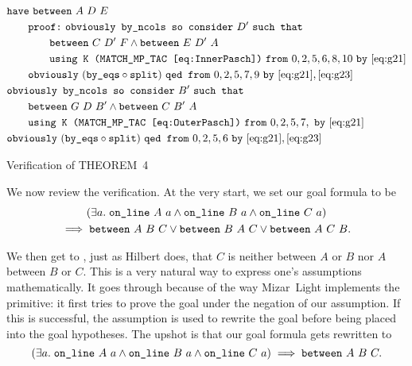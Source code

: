 \begin{boxedfigure}
\begin{align*}
&\texttt{have}\ \texttt{between}\ A\ D\ E\\
&\qquad \texttt{proof:}\ \texttt{obviously by\_ncols so consider}\ D'\ \texttt{such that}\\
&\qquad\qquad\texttt{between}\ C\ D'\ F\wedge\texttt{between}\ E\ D'\ A\\
&\qquad\qquad\texttt{using K (MATCH\_MP\_TAC \eqref{eq:InnerPasch})}\ \texttt{from}\ 0,2,5,6,8,10\ \texttt{by}\ \eqref{eq:g21}\\
&\qquad\texttt{obviously}\ (\texttt{by\_eqs}\circ\texttt{split})\ \texttt{qed from}\ 0,2,5,7,9\ \texttt{by}\ \eqref{eq:g21},\eqref{eq:g23}\\
&\texttt{obviously by\_ncols so consider}\ B'\ \texttt{such that}\\
&\qquad\texttt{between}\ G\ D\ B'\wedge\texttt{between}\ C\ B'\ A\\
&\qquad\texttt{using K (MATCH\_MP\_TAC \eqref{eq:OuterPasch})}\ \texttt{from}\ 0,2,5,7,\ \texttt{by}\ \eqref{eq:g21}\\
&\texttt{obviously}\ (\texttt{by\_eqs}\circ\texttt{split})\ \texttt{qed from}\ 0,2,5,6\ \texttt{by}\ \eqref{eq:g21},\eqref{eq:g23}\\
\end{align*}
\caption{Verification of THEOREM~4}
\label{fig:FourVerification}
\end{boxedfigure}

We now review the verification. At the very start, we set our goal formula to be
\begin{multline*}
(\exists a.\; \texttt{on\_line}\ A\ a\wedge\texttt{on\_line}\ B\ a\wedge\texttt{on\_line}\ C\ a) \\\implies\texttt{between}\ A\ B\ C\vee\texttt{between}\ B\ A\ C\vee\texttt{between}\ A\ C\ B.
\end{multline*}

We then get to , just as Hilbert does, that $C$ is neither between $A$ or $B$ nor $A$ between $B$ or $C$. This is a very natural way to express one's assumptions mathematically. It goes through because of the way Mizar~Light implements the  primitive: it first tries to prove the goal under the negation of our assumption. If this is successful, the assumption is used to rewrite the goal before being placed into the goal hypotheses. The upshot is that our goal formula gets rewritten to
\begin{displaymath}
(\exists a.\; \texttt{on\_line}\ A\ a\wedge\texttt{on\_line}\ B\ a\wedge\texttt{on\_line}\ C\ a) \implies\texttt{between}\ A\ B\ C.
\end{displaymath}

